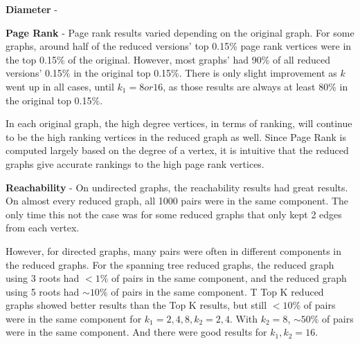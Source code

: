 \documentclass[11pt]{article}
\begin{document}
\textbf{Diameter} - 

\iffalse
Across all undirected reduced graphs, the diameter, using the approximation algorithm, was always within +/- 2 (within 15\%) of the diameter of the original graph.  The approximation typically had more error when only two or four edges were kept for each vertex in the top $k$ reductions. All in all, the approximate diameter measured in the reduced graphs were very close to the original graph's diameter in all reduced graph iterations for undirected graphs.

For directed graphs, the results are not very good.  The approximate diameter fluctuates heavily.  As an example, the wikivote graph from Stanford's SNAP measured an approximate diameter of 35 on the reduced graph that kept the top 8 neighbours, and an approximate diameter of 11 on the reduced graph that kept the top 4 neighbours.
\fi

\textbf{Page Rank} - Page rank results varied depending on the original graph.  For some graphs, around half of the reduced versions' top 0.15\% page rank vertices were in the top 0.15\% of the original. However, most graphs' had 90\% of all reduced versions' 0.15\% in the original top 0.15\%.  There is only slight improvement as $k$ went up in all cases, until $k_1 = 8 or 16$, as those results are always at least 80\% in the original top 0.15\%.

In each original graph, the high degree vertices, in terms of ranking, will continue to be the high ranking vertices in the reduced graph as well.  Since Page Rank is computed largely based on the degree of a vertex, it is intuitive that the reduced graphs give accurate rankings to the high page rank vertices.


\textbf{Reachability} - On undirected graphs, the reachability results had great results.  On almost every reduced graph, all 1000 pairs were in the same component.  The only time this not the case was for some reduced graphs that only kept 2 edges from each vertex.

However, for directed graphs, many pairs were often in different components in the reduced graphs.  For the spanning tree reduced graphs, the reduced graph using 3 roots had $< 1\%$ of pairs in the same component, and the reduced graph using 5 roots had $\sim 10\%$ of pairs in the same component.  T Top K reduced graphs showed better results than the Top K results, but still $<10\%$ of pairs were in the same component for $k_1 = 2, 4, 8, k_2 = 2, 4$.  With $k_2 = 8$, $\sim50\%$ of pairs were in the same component.  And there were good results for $k_1, k_2 = 16$.
\end{document}

